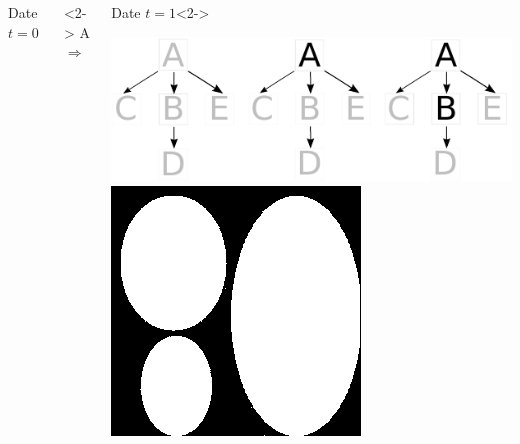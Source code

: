 \begin{frame}
\begin{columns}[c]
\begin{exampleblock}{Date $t=0$}
\begin{center}
					\end{center}
				\end{exampleblock}
			\column{0.1em}<2->		
				A\\		
				$\Rightarrow$
			\column{6em}
				\begin{exampleblock}{Date $t=1$}<2->
					\begin{center}
						\includegraphics[trim= 28mm 0mm 28mm 0mm, clip, height=0.7\textwidth]{image/contex_gt.pdf}	\vspace{1em}
						\includegraphics[trim= 0mm 0mm 0mm 0mm, clip, height=0.7\textwidth]{image/me_1_3_img_6.png}	\\%

\end{center}
\end{exampleblock}
\end{columns}
\end{frame}
